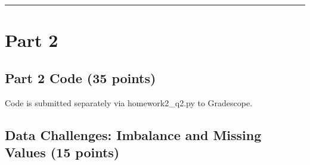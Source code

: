 \documentclass[12pt]{article}
\begin{document}
\vspace{1em}
\hrule
\vspace{1em}

\section{Part 2}

\subsection{Part 2 Code (35 points)}
Code is submitted separately via homework2\_q2.py to Gradescope.

\subsection{Data Challenges: Imbalance and Missing Values (15 points)}
\end{document}
